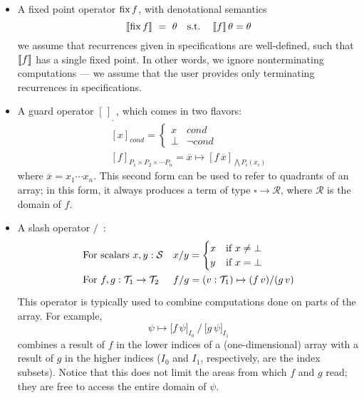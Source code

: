 \begin{itemize}
  \item A fixed point operator $\operatorname{fix} f$, with denotational semantics
    \[[\![{\operatorname{fix} f}]\!] ~=~ \theta \textrm{ ~ s.t. ~ } [\![{f}]\!]\,\theta=\theta\]
  we assume that recurrences given in specifications are well-defined, 
  such that $[\![{f}]\!]$ has a single fixed point.
  In other words, we ignore nonterminating computations ---
  we assume that the user provides only terminating recurrences in specifications.%
  \item A guard operator $[\,]_{_\square}\,$, which comes in two flavors: 
  \[\begin{array}{l}
      [x]_{\mathit{cond}} = \begin{cases}x & \mathit{cond} \\ \bot & \lnot\mathit{cond}\end{cases} \\
      {}[f]_{P_1\times P_2\times \cdots P_n} = \overline{x} \mapsto [f\,\overline{x}]_{\bigwedge P_i(x_i)} 
    \end{array}\]
  where $\overline{x} = x_1 \cdots x_n$. This second form can be used to
  refer to quadrants of an array; in this form, it always produces a term of
  type $\square\to\mathcal{R}$, where $\mathcal{R}$ is the domain of $f$.
  \item A slash operator $/$~:     \vspace{-2pt}
  \[\renewcommand\arraystretch{1.5}
    \begin{array}{ll}
      \mbox{For scalars $x,y:\S$} & x/y = \begin{cases}x & \mbox{if }x\neq\bot \\ y & \mbox{if }x=\bot\end{cases} \\
      \mbox{For $f,g:\T_1\to\T_2$} & f/g = (v:\T_1)\mapsto (f\,v)/(g\,v)
    \end{array}\]
  This operator is typically used to combine computations done on
  parts of the array. For example, \[\psi\mapsto \big[f\,\psi\big]_{I_0} ~ \Big/ ~ \big[g\,\psi\big]_{I_1}\]
  combines a result of $f$ in the lower indices of a (one-dimensional) array
  with a result of $g$ in the higher indices ($I_0$ and $I_1$, respectively, are the index subsets).
  Notice that this does not limit the areas from which $f$ and $g$ read;
  they are free to access the entire domain of $\psi$.
\end{itemize}


